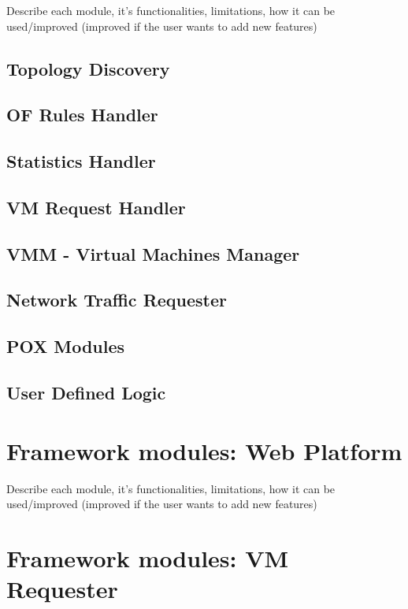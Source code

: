 \documentclass[12pt,english]{book}
\begin{document}
Describe each module, it's functionalities, limitations, how it can be used/improved (improved if the user wants to add new features)

\subsection{Topology Discovery}

\subsection{OF Rules Handler}

\subsection{Statistics Handler}

\subsection{VM Request Handler}

\subsection{VMM - Virtual Machines Manager}

\subsection{Network Traffic Requester}

\subsection{POX Modules}

\subsection{User Defined Logic}

\newpage


\section{Framework modules: Web Platform}

Describe each module, it's functionalities, limitations, how it can be used/improved (improved if the user wants to add new features)

\newpage


\section{Framework modules: VM Requester}
\end{document}
